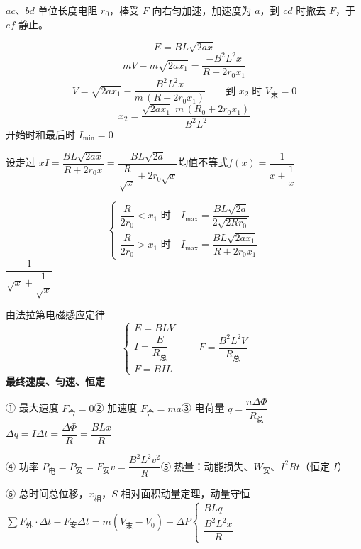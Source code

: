 \begin{problem}
$ac$、$bd$ 单位长度电阻 $r_0$，棒受 $F$ 向右匀加速，加速度为 $a$，到 $cd$ 时撤去 $F$，于 $ef$ 静止。
\begin{solution}
\[ E=BL\sqrt{2ax} \]
\[ mV-m\sqrt{2ax_1}=\frac{-B^2L^2x}{R+2r_0x_1} \]
\[ V=\sqrt{2ax_1}-\frac{B^2L^2x}{m\,(R+2r_0x_1)}\qquad \text{到 }x_2\text{ 时 }V_{\text{末}}=0 \]
\[ x_2=\frac{\sqrt{2ax_1}\;m\,(R_0+2r_0x_1)}{B^2L^2} \] %
开始时和最后时 $I_{\min}=0$

设走过 $x$\quad $I=\dfrac{BL\sqrt{2ax}}{R+2r_0x}=\dfrac{BL\sqrt{2a}}{\dfrac{R}{\sqrt{x}}+2r_0\sqrt{x}}$\quad 均值不等式\quad $f(x)=\dfrac{1}{x+\dfrac{1}{x}}$

\[ \left\{\begin{array}{l}
\dfrac{R}{2r_0}<x_1\text{ 时}\quad I_{\max}=\dfrac{BL\sqrt{2a}}{2\sqrt{2Rr_0}}\\[3ex]
\dfrac{R}{2r_0}>x_1\text{ 时}\quad I_{\max}=\dfrac{BL\sqrt{2ax_1}}{R+2r_0x_1}
\end{array}\right. \]
$\dfrac{1}{\sqrt{x}+\dfrac{1}{\sqrt{x}}}$
\end{solution}
\end{problem}
由法拉第电磁感应定律
\[ \left\{\begin{array}{l} E=BLV\\ I=\dfrac{E}{R_{\text{总}}}\\ F=BIL\end{array}\right.\qquad F=\frac{B^2L^2V}{R_{\text{总}}} \]
\textbf{最终速度、匀速、恒定}

① 最大速度 $F_{\text{合}}=0$\quad ② 加速度 $F_{\text{合}}=ma$\quad ③ 电荷量 $q=\dfrac{n\Delta\Phi}{R_{\text{总}}}$\qquad $\Delta q=I\Delta t=\dfrac{\Delta\Phi}{R}=\dfrac{BLx}{R}$

④ 功率 $P_{\text{电}}=P_{\text{安}}=F_{\text{安}}v=\dfrac{B^2L^2v^2}{R}$\quad ⑤ 热量：动能损失、$W_{\text{安}}$、$I^2Rt$（恒定 $I$）

⑥ 总时间总位移，$x_{\text{相}}$，$S$ 相对面积\quad 动量定理，动量守恒 $\sum F_{\text{外}}\cdot\Delta t-F_{\text{安}}\Delta t=m(V_{\text{末}}-V_0)-\Delta P$\quad $\left\{\begin{array}{l}BLq\\[0.5ex] \dfrac{B^2L^2x}{R}\end{array}\right.$

